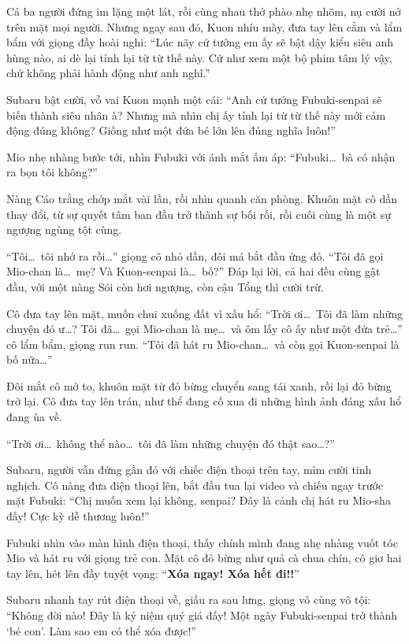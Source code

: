 \documentclass[../main.tex]{subfiles}
\begin{document}
Cả ba người đứng im lặng một lát, rồi cùng nhau thở phào nhẹ nhõm, nụ cười nở trên mặt mọi người. Nhưng ngay sau đó, Kuon nhíu mày, đưa tay lên cằm và lẩm bẩm với giọng đầy hoài nghi: ``Lúc nãy cứ tưởng em ấy sẽ bật dậy kiểu siêu anh hùng nào, ai dè lại tỉnh lại từ từ thế này. Cứ như xem một bộ phim tâm lý vậy, chứ không phải hành động như anh nghĩ.''

Subaru bật cười, vỗ vai Kuon mạnh một cái: ``Anh cứ tưởng Fubuki-senpai sẽ biến thành siêu nhân à? Nhưng mà nhìn chị ấy tỉnh lại từ từ thế này mới cảm động đúng không? Giống như một đứa bé lớn lên đúng nghĩa luôn!''

Mio nhẹ nhàng bước tới, nhìn Fubuki với ánh mắt ấm áp: ``Fubuki\dots\ bà có nhận ra bọn tôi không?''

Nàng Cáo trắng chớp mắt vài lần, rồi nhìn quanh căn phòng. Khuôn mặt cô dần thay đổi, từ sự quyết tâm ban đầu trở thành sự bối rối, rồi cuối cùng là một sự ngượng ngùng tột cùng.

``Tôi\dots\ tôi nhớ ra rồi\dots'' giọng cô nhỏ dần, đôi má bắt đầu ửng đỏ. ``Tôi đã gọi Mio-chan là\dots\ mẹ? Và Kuon-senpai là\dots\ bố?'' Đáp lại lời, cả hai đều cùng gật đầu, với một nàng Sói còn hơi ngượng, còn cậu Tổng thì cười trừ.

Cô đưa tay lên mặt, muốn chui xuống đất vì xấu hổ: ``Trời ơi\dots\ Tôi đã làm những chuyện đó ư\dots? Tôi đã\dots\ gọi Mio-chan là mẹ\dots\ và ôm lấy cô ấy như một đứa trẻ\dots'' cô lẩm bẩm, giọng run run. ``Tôi đã hát ru Mio-chan\dots\ và còn gọi Kuon-senpai là bố nữa\dots''

Đôi mắt cô mở to, khuôn mặt từ đỏ bừng chuyển sang tái xanh, rồi lại đỏ bừng trở lại. Cô đưa tay lên trán, như thể đang cố xua đi những hình ảnh đáng xấu hổ đang ùa về.

``Trời ơi\dots\ không thể nào\dots\ tôi đã làm những chuyện đó thật sao\dots?''

Subaru, người vẫn đứng gần đó với chiếc điện thoại trên tay, mỉm cười tinh nghịch. Cô nàng đưa điện thoại lên, bắt đầu tua lại video và chiếu ngay trước mặt Fubuki: ``Chị muốn xem lại không, senpai? Đây là cảnh chị hát ru Mio-sha đấy! Cực kỳ dễ thương luôn!''

Fubuki nhìn vào màn hình điện thoại, thấy chính mình đang nhẹ nhàng vuốt tóc Mio và hát ru với giọng trẻ con. Mặt cô đỏ bừng như quả cà chua chín, cô giơ hai tay lên, hét lên đầy tuyệt vọng: ``\textbf{Xóa ngay! Xóa hết đi!!}''

Subaru nhanh tay rút điện thoại về, giấu ra sau lưng, giọng vô cùng vô tội: ``Không đời nào! Đây là kỷ niệm quý giá đấy! Một ngày Fubuki-senpai trở thành `bé con'. Làm sao em có thể xóa được!''
\end{document}
